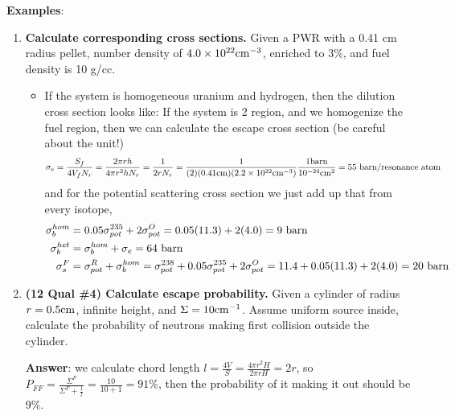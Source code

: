 \documentclass{school-22.211-notes}
\begin{document}
\textbf{Examples}: 
\begin{enumerate}
\item \textbf{Calculate corresponding cross sections.} Given a PWR with a 0.41 cm radius pellet,  number density of $4.0 \times 10^{22} \mathrm{cm}^{-3}$, enriched to 3\%, and fuel density is 10 g/cc. 
\begin{itemize}
\item If the system is homogeneous uranium and hydrogen, then the dilution cross section looks like:
If the system is 2 region, and we homogenize the fuel region, then we can calculate the escape cross section (be careful about the unit!) 
\begin{align}
\sigma_e &= \frac{S_f}{4 V_f N_r} = \frac{2 \pi r h}{4 \pi r^2 h N_r} = \frac{1}{2 r N_r} = \frac{1}{(2)(0.41 \mathrm{cm})(2.2 \times 10^{22} \mathrm{cm}^{-3})} \frac{1 \mathrm{barn}}{10^{-24} \mathrm{cm}^2} = 55 \mbox{ } \mathrm{barn}/\mbox{resonance atom}
\end{align}
and for the potential scattering cross section we just add up that from every isotope, 
\begin{align}
\sigma_b^{hom} &=  0.05 \sigma_{pot}^{235} + 2 \sigma_{pot}^O = 0.05 (11.3) + 2 (4.0) = 9 \mbox{ } \mathrm{barn} \\
\sigma_b^{het} &= \sigma_b^{hom} + \sigma_e = 64 \mbox{ } \mathrm{barn} \\ 
\sigma_s^F &= \sigma_{pot}^R + \sigma_b^{hom} = \sigma_{pot}^{238} + 0.05 \sigma_{pot}^{235} + 2 \sigma_{pot}^O = 11.4 + 0.05 (11.3) + 2 (4.0) = 20 \mbox{ } \mathrm{barn} 
\end{align} 
\end{itemize}

\item \textbf{(12 Qual \#4) Calculate escape probability.} Given a cylinder of radius $r=0.5\mathrm{cm}$, infinite height, and $\Sigma = 10 \mathrm{cm}^{-1}$. Assume uniform source inside, calculate the probability of neutrons making first collision outside the cylinder. 

\textbf{Answer}: we calculate chord length $l = \frac{4V}{S} = \frac{4 \pi r^2 H}{2 \pi r H} = 2r$, so $\displaystyle P_{FF} = \frac{\Sigma^F}{\Sigma^F + \frac{1}{l}} = \frac{10}{10+1} = 91$\%, then the probability of it making it out should be 9\%. 
\end{enumerate}
\end{document}
